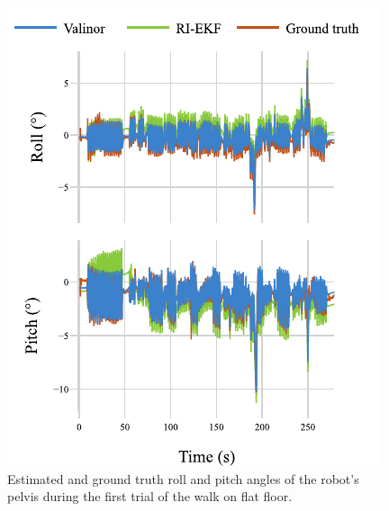 \documentclass{IJCAS}
\begin{document}
\begin{figure}[!h]
\begin{center}
\includegraphics[width=\columnwidth]{Uploaded/Images/tilt.pdf} 
\vskip -0.5pc
\caption{Estimated and ground truth roll and pitch angles of the robot's pelvis during the first trial of the walk on flat floor.}\label{fig:tilt_rhps1}
\end{center}
\vskip -1.5pc
\end{figure}
\end{document}
